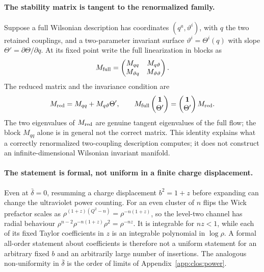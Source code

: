 \documentclass[11pt,a4paper]{article}
\numberwithin{equation}{section}
\newcommand{\db}{\bar\delta}
\begin{document}
\paragraph{The stability matrix is tangent to the renormalized family.} Suppose a full Wilsonian description has
coordinates $(q^a,\vartheta^i)$, with $q$ the two retained couplings, and a two-parameter invariant surface
$\vartheta^i=\Theta^i(q)$ with slope $\Theta'=\partial\Theta/\partial q$. At its fixed point write the full
linearization in blocks as
\begin{equation}
 M_{\rm full}=\begin{pmatrix}M_{qq}&M_{q\vartheta}\\ M_{\vartheta q}&M_{\vartheta\vartheta}\end{pmatrix}.
\end{equation}
The reduced matrix and the invariance condition are
\begin{equation}
 M_{\rm red}=M_{qq}+M_{q\vartheta}\Theta',\qquad
 M_{\rm full}\begin{pmatrix}\mathbf 1\\ \Theta'\end{pmatrix}=\begin{pmatrix}\mathbf 1\\ \Theta'\end{pmatrix}M_{\rm red}.
\end{equation}
The two eigenvalues of $M_{\rm red}$ are genuine tangent eigenvalues of the full flow; the block $M_{qq}$ alone is in
general not the correct matrix. This identity explains what a correctly renormalized two-coupling description
computes; it does not construct an infinite-dimensional Wilsonian invariant manifold.

\paragraph{The statement is formal, not uniform in a finite charge displacement.} Even at $\db=0$, resumming a charge
displacement $b^2=1+z$ before expanding can change the ultraviolet power counting. For an even cluster of $n$ flips the
Wick prefactor scales as $\rho^{(1+z)(Q^2-n)}=\rho^{-n(1+z)}$, so the level-two channel has radial behaviour
$\rho^{n-2}\rho^{-n(1+z)}\rho^2=\rho^{-nz}$. It is integrable for $nz<1$, while each of its fixed Taylor coefficients in
$z$ is an integrable polynomial in $\log\rho$. A formal all-order statement about coefficients is therefore not a
uniform statement for an arbitrary fixed $b$ and an arbitrarily large number of insertions. The analogous
non-uniformity in $\db$ is the order of limits of Appendix~\ref{app:clos:power}.
\end{document}

